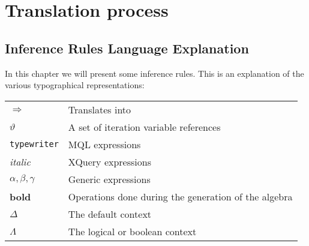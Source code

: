 \chapter{Translation process}

\section{Inference Rules Language Explanation}
\label{sect:translation:inferenceExplanation}
In this chapter we will present some inference rules. This is an explanation of
the various typographical representations:

\begin{tabular}{l|l}

  $\Longrightarrow$  & Translates into \\
  $\vartheta$ & A set of iteration variable references \\
  \texttt{typewriter} & MQL expressions \\
  \textit{italic} & XQuery expressions \\
  $\alpha , \beta, \gamma$ & Generic expressions \\
  \textbf{bold} & Operations done during the generation of the algebra \\
  $\Delta$ & The default context \\
  $\Lambda$ & The logical or boolean context \\
  
\end{tabular}








